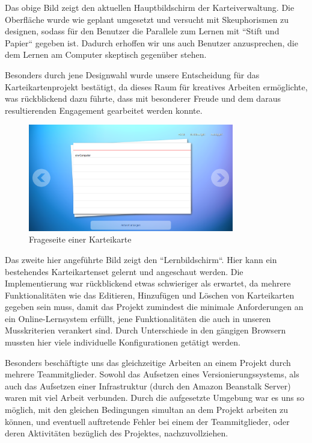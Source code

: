 \documentclass{article}
\begin{document}
Das obige Bild zeigt den aktuellen Hauptbildschirm der Karteiverwaltung. Die Oberfläche wurde wie geplant umgesetzt und versucht mit Skeuphorismen zu designen, sodass für den Benutzer die Parallele zum Lernen mit ``Stift und Papier`` gegeben ist. Dadurch erhoffen wir uns auch Benutzer anzusprechen, die dem Lernen am Computer skeptisch gegenüber stehen.

Besonders durch jene Designwahl wurde unsere Entscheidung für das Karteikartenprojekt bestätigt, da dieses Raum für kreatives Arbeiten ermöglichte, was rückblickend dazu führte, dass mit besonderer Freude und dem daraus resultierenden Engagement gearbeitet werden konnte.

\begin{figure}[H]
    \centering
    \includegraphics[width=0.8\textwidth]{images/learningscreen-answer.png}
    \caption{Frageseite einer Karteikarte}
    \label{fig:learning-question}
\end{figure}

Das zweite hier angeführte Bild zeigt den ``Lernbildschirm``. Hier kann ein bestehendes Karteikartenset gelernt und angeschaut werden. Die Implementierung war rückblickend etwas schwieriger als erwartet, da mehrere Funktionalitäten wie das Editieren, Hinzufügen und Löschen von Karteikarten gegeben sein muss, damit das Projekt zumindest die minimale Anforderungen an ein Online-Lernsystem erfüllt, jene Funktionalitäten die auch in unseren Musskriterien verankert sind. Durch Unterschiede in den gängigen Browsern mussten hier viele individuelle Konfigurationen getätigt werden.

Besonders beschäftigte uns das gleichzeitige Arbeiten an einem Projekt durch mehrere Teammitglieder. Sowohl das Aufsetzen eines Versionierungssystems, als auch das Aufsetzen einer Infrastruktur (durch den Amazon Beanstalk Server) waren mit viel Arbeit verbunden. Durch die aufgesetzte Umgebung war es uns so möglich, mit den gleichen Bedingungen simultan an dem Projekt arbeiten zu können, und eventuell auftretende Fehler bei einem der Teammitglieder, oder deren Aktivitäten bezüglich des Projektes, nachzuvollziehen.
\end{document}

